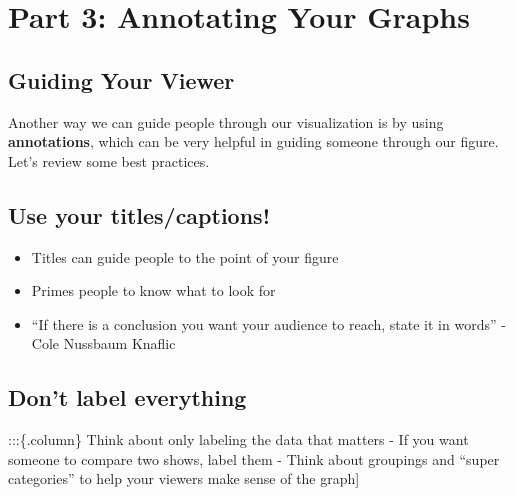 \documentclass[
  letterpaper,
  DIV=11,
  numbers=noendperiod]{scrreprt}
\providecommand{\tightlist}{%
  \setlength{\itemsep}{0pt}\setlength{\parskip}{0pt}}\usepackage{longtable,booktabs,array}
\begin{document}
\chapter*{Part 3: Annotating Your
Graphs}\label{part-3-annotating-your-graphs}


\section*{Guiding Your Viewer}\label{guiding-your-viewer}


Another way we can guide people through our visualization is by using
\textbf{annotations}, which can be very helpful in guiding someone
through our figure. Let's review some best practices.

\section*{Use your titles/captions!}\label{use-your-titlescaptions}


\begin{itemize}
\tightlist
\item
  Titles can guide people to the point of your figure
\item
  Primes people to know what to look for
\item
  ``If there is a conclusion you want your audience to reach, state it
  in words'' - Cole Nussbaum Knaflic
\end{itemize}

\section*{Don't label everything}\label{dont-label-everything}


:::\{.column\} Think about only labeling the data that matters - If you
want someone to compare two shows, label them - Think about groupings
and ``super categories'' to help your viewers make sense of the graph{]}
\end{document}
